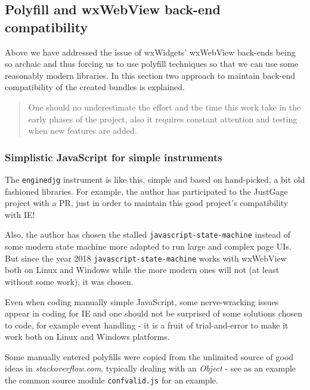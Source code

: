 \documentclass[11pt]{article}
\begin{document}
    \hypertarget{polyfill-and-wxwebview-back-end-compatibility}{%
\subsection{Polyfill and wxWebView back-end
compatibility}\label{polyfill-and-wxwebview-back-end-compatibility}}

    Above we have addressed the issue of wxWidgets' wxWebView back-ends
being so archaic and thus forcing us to use polyfill techniques so that
we can use some reasonably modern libraries. In this section two
approach to maintain back-end compatibility of the created bundles is
explained.

    \begin{quote}
One should no underestimate the effort and the time this work take in
the early phases of the project, also it requires constant attention and
testing when new features are added.
\end{quote}

    \hypertarget{simplistic-javascript-for-simple-instruments}{%
\subsubsection{Simplistic JavaScript for simple
instruments}\label{simplistic-javascript-for-simple-instruments}}

    The \texttt{enginedjg} instrument is like this, simple and based on
hand-picked, a bit old fashioned libraries. For example, the author has
participated to the JustGage project with a PR, just in order to
maintain this good project's compatibility with IE!

    Also, the author has chosen the stalled
\texttt{javascript-state-machine} instead of some modern state machine
more adapted to run large and complex page UIs. But since the year 2018
\texttt{javascript-state-machine} works with wxWebView both on Linux and
Windows while the more modern ones will not (at least without some
work), it was chosen.

    Even when coding manually simple JavaScript, some nerve-wracking issues
appear in coding for IE and one should not be surprised of some
solutions chosen to code, for example event handling - it is a fruit of
trial-and-error to make it work both on Linux and Windows platforms.

    Some manually entered polyfills were copied from the unlimited source of
good ideas in \emph{stackoverflow.com}, typically dealing with an
\emph{Object} - see as an example the common source module
\texttt{confvalid.js} for an example.
\end{document}
